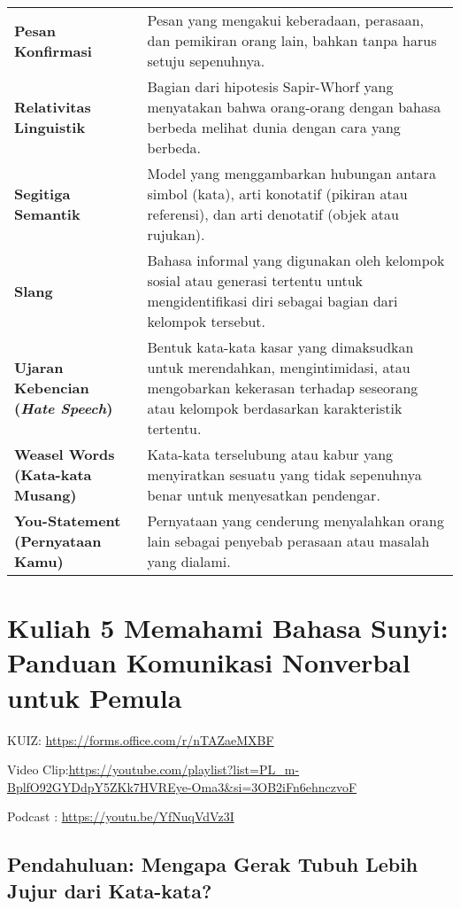 \documentclass[
  letterpaper,
  DIV=11,
  numbers=noendperiod]{scrreprt}
\begin{document}
\begin{longtable}[]{@{}
  >{\raggedright\arraybackslash}p{}
  >{\raggedright\arraybackslash}p{}@{}}
\textbf{Pesan Konfirmasi} & Pesan yang mengakui keberadaan, perasaan,
dan pemikiran orang lain, bahkan tanpa harus setuju sepenuhnya. \\
\textbf{Relativitas Linguistik} & Bagian dari hipotesis Sapir-Whorf yang
menyatakan bahwa orang-orang dengan bahasa berbeda melihat dunia dengan
cara yang berbeda. \\
\textbf{Segitiga Semantik} & Model yang menggambarkan hubungan antara
simbol (kata), arti konotatif (pikiran atau referensi), dan arti
denotatif (objek atau rujukan). \\
\textbf{Slang} & Bahasa informal yang digunakan oleh kelompok sosial
atau generasi tertentu untuk mengidentifikasi diri sebagai bagian dari
kelompok tersebut. \\
\textbf{Ujaran Kebencian (\emph{Hate Speech})} & Bentuk kata-kata kasar
yang dimaksudkan untuk merendahkan, mengintimidasi, atau mengobarkan
kekerasan terhadap seseorang atau kelompok berdasarkan karakteristik
tertentu. \\
\textbf{Weasel Words (Kata-kata Musang)} & Kata-kata terselubung atau
kabur yang menyiratkan sesuatu yang tidak sepenuhnya benar untuk
menyesatkan pendengar. \\
\textbf{You-Statement (Pernyataan Kamu)} & Pernyataan yang cenderung
menyalahkan orang lain sebagai penyebab perasaan atau masalah yang
dialami. \\
\end{longtable}


\chapter{Kuliah 5 Memahami Bahasa Sunyi: Panduan Komunikasi Nonverbal
untuk
Pemula}\label{kuliah-5-memahami-bahasa-sunyi-panduan-komunikasi-nonverbal-untuk-pemula}

KUIZ: \url{https://forms.office.com/r/nTAZaeMXBF}

Video
Clip:\url{https://youtube.com/playlist?list=PL_m-BplfO92GYDdpY5ZKk7HVREye-Oma3&si=3OB2iFn6ehnczvoF}

Podcast : \url{https://youtu.be/YfNuqVdVz3I}

\section{Pendahuluan: Mengapa Gerak Tubuh Lebih Jujur dari
Kata-kata?}\label{pendahuluan-mengapa-gerak-tubuh-lebih-jujur-dari-kata-kata}
\end{document}
